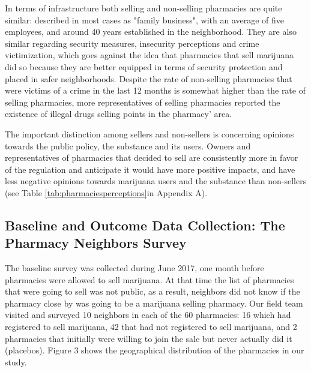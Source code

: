 \documentclass[11pt]{article}
\begin{document}
In terms of infrastructure both selling and non-selling pharmacies are quite similar:  described in most cases as "family business", with an average of five employees, and around 40 years established in the neighborhood. They are also similar regarding security measures, insecurity perceptions and crime victimization, which goes against the idea that pharmacies that sell marijuana did so because they are better equipped in terms of security protection and placed in safer neighborhoods. Despite the rate of non-selling pharmacies that were victims of a crime in the last 12 months is somewhat higher than the rate of selling pharmacies, more representatives of selling pharmacies reported the existence of illegal drugs selling points in the pharmacy' area. 

The important distinction among sellers and non-sellers is concerning opinions towards the public policy, the substance and its users. Owners and representatives of pharmacies that decided to sell are consistently more in favor of the regulation and anticipate it would have more positive impacts, and have less negative opinions towards marijuana users and the substance than non-sellers (see Table \ref{tab:pharmaciesperceptions}in Appendix A). 

\subsection{Baseline and Outcome Data Collection: The Pharmacy Neighbors Survey}

The baseline survey was collected during June 2017, one month before pharmacies were allowed to sell marijuana. At that time the list of pharmacies that were going to sell was not public, as a result, neighbors did not know if the pharmacy close by was going to be a marijuana selling pharmacy. Our field team visited and surveyed 10 neighbors in each of the 60 pharmacies: 16 which had registered to sell marijuana, 42 that had not registered to sell marijuana, and 2 pharmacies that initially were willing to join the sale but never actually did it (placebos). Figure 3 shows the geographical distribution of the pharmacies in our study.
\end{document}
